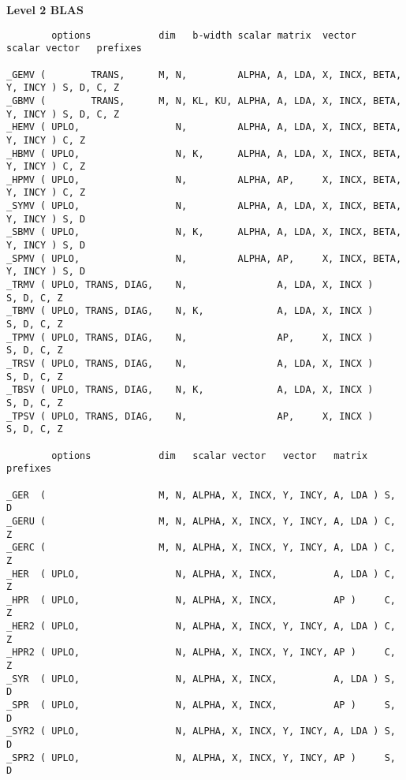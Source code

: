 {\bf Level 2 BLAS}
\begin{verbatim}
        options            dim   b-width scalar matrix  vector   scalar vector   prefixes

_GEMV (        TRANS,      M, N,         ALPHA, A, LDA, X, INCX, BETA,  Y, INCY ) S, D, C, Z
_GBMV (        TRANS,      M, N, KL, KU, ALPHA, A, LDA, X, INCX, BETA,  Y, INCY ) S, D, C, Z
_HEMV ( UPLO,                 N,         ALPHA, A, LDA, X, INCX, BETA,  Y, INCY ) C, Z
_HBMV ( UPLO,                 N, K,      ALPHA, A, LDA, X, INCX, BETA,  Y, INCY ) C, Z
_HPMV ( UPLO,                 N,         ALPHA, AP,     X, INCX, BETA,  Y, INCY ) C, Z
_SYMV ( UPLO,                 N,         ALPHA, A, LDA, X, INCX, BETA,  Y, INCY ) S, D
_SBMV ( UPLO,                 N, K,      ALPHA, A, LDA, X, INCX, BETA,  Y, INCY ) S, D
_SPMV ( UPLO,                 N,         ALPHA, AP,     X, INCX, BETA,  Y, INCY ) S, D
_TRMV ( UPLO, TRANS, DIAG,    N,                A, LDA, X, INCX )                 S, D, C, Z
_TBMV ( UPLO, TRANS, DIAG,    N, K,             A, LDA, X, INCX )                 S, D, C, Z
_TPMV ( UPLO, TRANS, DIAG,    N,                AP,     X, INCX )                 S, D, C, Z
_TRSV ( UPLO, TRANS, DIAG,    N,                A, LDA, X, INCX )                 S, D, C, Z
_TBSV ( UPLO, TRANS, DIAG,    N, K,             A, LDA, X, INCX )                 S, D, C, Z
_TPSV ( UPLO, TRANS, DIAG,    N,                AP,     X, INCX )                 S, D, C, Z

        options            dim   scalar vector   vector   matrix  prefixes

_GER  (                    M, N, ALPHA, X, INCX, Y, INCY, A, LDA ) S, D
_GERU (                    M, N, ALPHA, X, INCX, Y, INCY, A, LDA ) C, Z
_GERC (                    M, N, ALPHA, X, INCX, Y, INCY, A, LDA ) C, Z
_HER  ( UPLO,                 N, ALPHA, X, INCX,          A, LDA ) C, Z
_HPR  ( UPLO,                 N, ALPHA, X, INCX,          AP )     C, Z
_HER2 ( UPLO,                 N, ALPHA, X, INCX, Y, INCY, A, LDA ) C, Z
_HPR2 ( UPLO,                 N, ALPHA, X, INCX, Y, INCY, AP )     C, Z
_SYR  ( UPLO,                 N, ALPHA, X, INCX,          A, LDA ) S, D
_SPR  ( UPLO,                 N, ALPHA, X, INCX,          AP )     S, D
_SYR2 ( UPLO,                 N, ALPHA, X, INCX, Y, INCY, A, LDA ) S, D
_SPR2 ( UPLO,                 N, ALPHA, X, INCX, Y, INCY, AP )     S, D
\end{verbatim}

